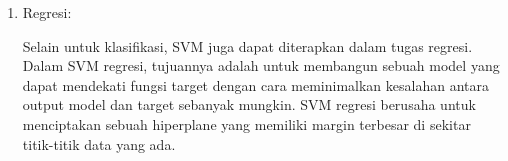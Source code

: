 \begin{enumerate}[nolistsep]
  \item Regresi:

        Selain untuk klasifikasi, SVM juga dapat diterapkan dalam tugas
        regresi. Dalam SVM regresi, tujuannya adalah untuk membangun sebuah
        model yang dapat mendekati fungsi target dengan cara meminimalkan
        kesalahan antara output model dan target sebanyak mungkin. SVM regresi
        berusaha untuk menciptakan sebuah hiperplane yang memiliki margin
        terbesar di sekitar titik-titik data yang ada.
\end{enumerate}
